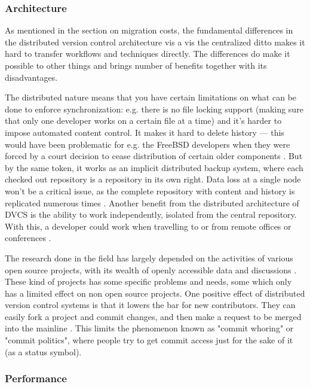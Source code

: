 \documentclass{llncs}
\begin{document}
\subsubsection{Architecture}

As mentioned in the section on migration costs, the fundamental
differences in the distributed version control architecture vis a vis 
the centralized ditto makes it hard to transfer workflows and
techniques directly. The differences do make it possible to other
things and brings number of benefits together with its disadvantages.

The distributed nature means that you have certain limitations on what
can be done to enforce synchronization: e.g. there is no file locking
support (making sure that only one developer works on a certain file
at a time) \cite{osullivan09} and it's harder to impose automated
content control. It makes it hard to delete history --- this would
have been problematic for e.g. the FreeBSD developers when they were
forced by a court decision to cease distribution of certain older
components \cite{alwis09}. But by the same token, it works as an
implicit distributed backup system, where each checked out repository
is a repository in its own right. Data loss at a single node won't be
a critical issue, as the complete repository with content and history
is replicated numerous times \cite{alwis09}. Another benefit from the
distributed architecture of DVCS is the ability to work independently,
isolated from the central repository. With this, a developer could
work when travelling to or from remote offices or conferences
\cite{alwis09}\cite{robert06}.

The research done in the field has largely depended on the activities
of various open source projects, with its wealth of openly accessible
data and discussions \cite{alwis09}\cite{bird09}. These kind of
projects has some specific problems and needs, some which only has a
limited effect on non open source projects. One positive effect of
distributed version control systems is that it lowers the bar for new
contributors. They can easily fork a project and commit changes, and
then make a request to be merged into the mainline \cite{alwis09}.
This limits the phenomenon known as "commit whoring" or "commit
politics", where people try to get commit access just for the sake of
it (as a status symbol).

\subsubsection{Performance}
\end{document}
